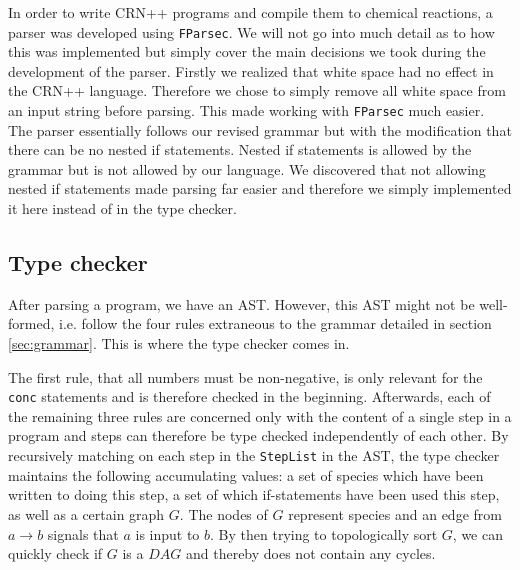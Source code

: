 In order to write CRN++ programs and compile them to chemical reactions, a parser was developed using \texttt{FParsec}. We will not go into much detail as to how this was implemented but simply cover the main decisions we took during the development of the parser. Firstly we realized that white space had no effect in the CRN++ language. Therefore we chose to simply remove all white space from an input string before parsing. This made working with \texttt{FParsec} much easier. The parser essentially follows our revised grammar but with the modification that there can be no nested if statements. Nested if statements is allowed by the grammar but is not allowed by our language. We discovered that not allowing nested if statements made parsing far easier and therefore we simply implemented it here instead of in the type checker.



\subsection{Type checker}
After parsing a program, we have an AST. However, this AST might not be well-formed, i.e. follow the four rules extraneous to the grammar detailed in section \ref{sec:grammar}. This is where the type checker comes in. 

The first rule, that all numbers must be non-negative, is only relevant for the \texttt{conc} statements and is therefore checked in the beginning. Afterwards, each of the remaining three rules are concerned only with the content of a single step in a program and steps can therefore be type checked independently of each other. By recursively matching on each step in the \texttt{StepList} in the AST, the type checker maintains the following accumulating values: a set of species which have been written to doing this step, a set of which if-statements have been used this step, as well as a certain graph $G$. The nodes of $G$ represent species and an edge from $a\to b$ signals that $a$ is input to $b$. By then trying to topologically sort $G$, we can quickly check if $G$ is a $DAG$ and thereby does not contain any cycles.



